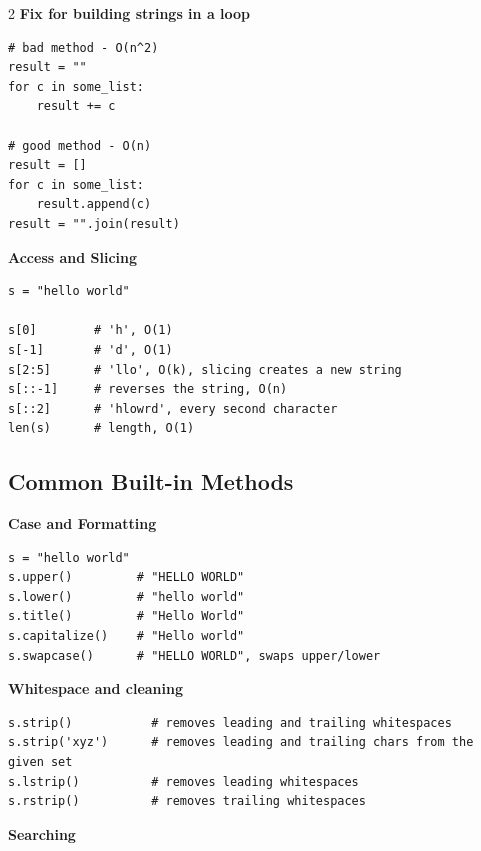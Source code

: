 \documentclass[9pt,a4paper]{extarticle}
\begin{document}
\begin{multicols}{2}
\noindent\textbf{Fix for building strings in a loop}\par\nopagebreak\vspace{1pt}

\begin{lstlisting}
# bad method - O(n^2)
result = ""
for c in some_list:
    result += c

# good method - O(n)
result = []
for c in some_list:
    result.append(c)
result = "".join(result)
\end{lstlisting}

\noindent\textbf{Access and Slicing}\par\nopagebreak\vspace{1pt}

\begin{lstlisting}
s = "hello world"

s[0]        # 'h', O(1)
s[-1]       # 'd', O(1)
s[2:5]      # 'llo', O(k), slicing creates a new string
s[::-1]     # reverses the string, O(n)
s[::2]      # 'hlowrd', every second character
len(s)      # length, O(1)
\end{lstlisting}

\subsection{Common Built-in Methods}

\noindent\textbf{Case and Formatting}\par\nopagebreak\vspace{1pt}

\begin{lstlisting}
s = "hello world"
s.upper()         # "HELLO WORLD"
s.lower()         # "hello world"
s.title()         # "Hello World"
s.capitalize()    # "Hello world"
s.swapcase()      # "HELLO WORLD", swaps upper/lower
\end{lstlisting}

\noindent\textbf{Whitespace and cleaning}\par\nopagebreak\vspace{1pt}

\begin{lstlisting}
s.strip()           # removes leading and trailing whitespaces
s.strip('xyz')      # removes leading and trailing chars from the given set
s.lstrip()          # removes leading whitespaces
s.rstrip()          # removes trailing whitespaces
\end{lstlisting}

\noindent\textbf{Searching}\par\nopagebreak\vspace{1pt}


\end{multicols}
\end{document}
